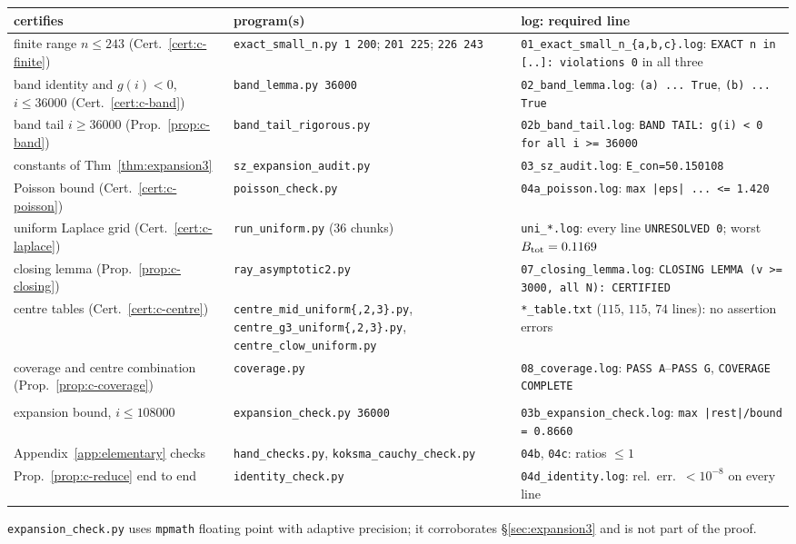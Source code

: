 \begin{center}
\small
\renewcommand{\arraystretch}{1.12}
\begin{longtable}{@{}>{\raggedright\arraybackslash}p{}>{\raggedright\arraybackslash}p{}>{\raggedright\arraybackslash}p{}@{}}
\toprule
certifies & program(s) & log: required line\\
\midrule
\endhead
finite range $n\le243$ (Cert.~\ref{cert:c-finite}) & \texttt{exact\_small\_n.py 1 200}; \texttt{201 225}; \texttt{226 243} &
\texttt{01\_exact\_small\_n\_\{a,b,c\}.log}: \texttt{EXACT n in [..]: violations 0} in all three\\
band identity and $g(i)<0$, $i\le36000$ (Cert.~\ref{cert:c-band}) & \texttt{band\_lemma.py 36000} &
\texttt{02\_band\_lemma.log}: \texttt{(a) ... True}, \texttt{(b) ... True}\\
band tail $i\ge36000$ (Prop.~\ref{prop:c-band}) & \texttt{band\_tail\_rigorous.py} &
\texttt{02b\_band\_tail.log}: \texttt{BAND TAIL: g(i) < 0 for all i >= 36000}\\
constants of Thm~\ref{thm:expansion3} & \texttt{sz\_expansion\_audit.py} & \texttt{03\_sz\_audit.log}: \texttt{E\_con=50.150108}\\
Poisson bound (Cert.~\ref{cert:c-poisson}) & \texttt{poisson\_check.py} & \texttt{04a\_poisson.log}: \texttt{max |eps| ... <= 1.420}\\
uniform Laplace grid (Cert.~\ref{cert:c-laplace}) & \texttt{run\_uniform.py} ($36$ chunks) &
\texttt{uni\_*.log}: every line \texttt{UNRESOLVED 0}; worst $B_{\rm tot}=0.1169$\\
closing lemma (Prop.~\ref{prop:c-closing}) & \texttt{ray\_asymptotic2.py} &
\texttt{07\_closing\_lemma.log}: \texttt{CLOSING LEMMA (v >= 3000, all N): CERTIFIED}\\
centre tables (Cert.~\ref{cert:c-centre}) & \texttt{centre\_mid\_\allowbreak uniform\{,2,3\}.py}, \texttt{centre\_g3\_\allowbreak uniform\{,2,3\}.py},
\texttt{centre\_clow\_uniform.py} & \texttt{*\_table.txt} ($115$, $115$, $74$ lines): no assertion errors\\
coverage and centre combination (Prop.~\ref{prop:c-coverage}) & \texttt{coverage.py} &
\texttt{08\_coverage.log}: \texttt{PASS A}--\texttt{PASS G}, \texttt{COVERAGE COMPLETE}\\
\midrule
\multicolumn{3}{@{}l}{\emph{Consistency checks, not part of the proof}}\\
expansion bound, $i\le108000$ & \texttt{expansion\_check.py 36000} & \texttt{03b\_expansion\_check.log}: \texttt{max |rest|/bound = 0.8660}\\
Appendix~\ref{app:elementary} checks & \texttt{hand\_checks.py}, \texttt{koksma\_cauchy\_check.py} & \texttt{04b}, \texttt{04c}: ratios $\le1$\\
Prop.~\ref{prop:c-reduce} end to end & \texttt{identity\_check.py} & \texttt{04d\_identity.log}: rel.\ err.\ $<10^{-8}$ on every line\\
\bottomrule
\end{longtable}
\end{center}
\texttt{expansion\_check.py} uses \texttt{mpmath} floating point with adaptive precision; it corroborates
\S\ref{sec:expansion3} and is not part of the proof.

